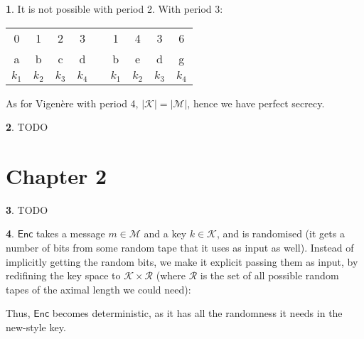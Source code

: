 \documentclass{article}
\theoremstyle{definition}
\newcommand{\abs}[1]{\left|#1\right|}
\newcommand{\Enc}{\mathsf{Enc}}
\newcommand{\Ms}{\mathcal{M}} %
\newcommand{\Ks}{\mathcal{K}} %
\theoremstyle{definition}
\theoremstyle{definition}
\newtheorem{solution-internal}{}[subsection]
\newenvironment{solution}{
  \begin{solution-internal}
}{
  \end{solution-internal}
}
\begin{document}
\begin{solution}
  It is not possible with period 2. With period 3:

  \begin{center}
\setlength{\tabcolsep}{2pt}
  \begin{tabular}{cccc p{5mm} cccc}
    0 & 1 & 2 & 3 & & 1 & 4 & 3 & 6 \\
    a & b & c & d & & b & e & d & g \\
    $k_1$ & $k_2$ & $k_3$ & $k_4$ & & $k_1$ & $k_2$ & $k_3$ & $k_4$ \\
  \end{tabular}
  \end{center}

  As for Vigenère with period 4, $\abs{\Ks} = \abs{\Ms}$, hence we have perfect
  secrecy.
\end{solution}

\begin{solution}
  TODO
\end{solution}

\section*{Chapter 2}
\setcounter{section}{2}
\setcounter{subsection}{2}
\setcounter{solution-internal}{0}
\begin{solution}
  TODO
\end{solution}
\begin{solution}
$\Enc$ takes a message $m \in \Ms$ and a key $k \in \Ks$, and is randomised (it
gets a number of bits from some random tape that it uses as input as well).
Instead of implicitly getting the random bits, we make it explicit passing them
as input, by redifining the key space to $\Ks \times \mathcal{R}$ (where
$\mathcal{R}$ is the set of all possible random tapes of the aximal length we
could need):

Thus, $\Enc$ becomes deterministic, as it has all the randomness it needs in the
new-style key.
\end{solution}
\end{document}
